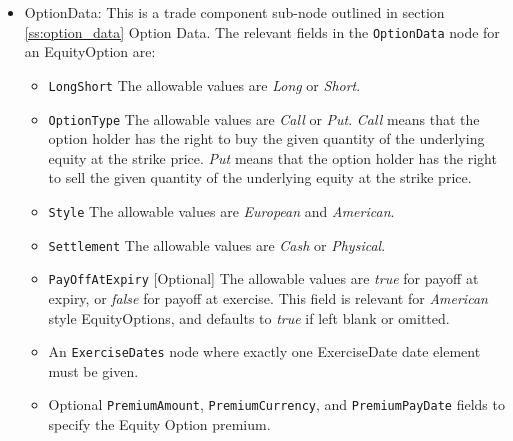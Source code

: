 \begin{itemize}
	\item OptionData: This is a trade component sub-node outlined in section \ref{ss:option_data} Option Data. The relevant fields in the \lstinline!OptionData! node for an EquityOption are:

	
	\begin{itemize}
	\item \lstinline!LongShort! The allowable values are \emph{Long} or \emph{Short}.

	\item \lstinline!OptionType! The allowable values are \emph{Call} or \emph{Put}.  \emph{Call} means that the option holder has the right to buy the given quantity of the underlying equity at the strike price.  \emph{Put} means that the option holder has the right to sell the given quantity of the underlying equity at the strike price. 
	
\item  \lstinline!Style! The allowable values are \emph{European} and \emph{American}. 

\item  \lstinline!Settlement! The allowable values are \emph{Cash} or \emph{Physical}.

\item \lstinline!PayOffAtExpiry! [Optional] The allowable values are \emph{true} for payoff at expiry, or \emph{false} for payoff at exercise. This field is relevant for \emph{American} style EquityOptions, and defaults to \emph{true} if left blank or omitted. 

\item An \lstinline!ExerciseDates! node where exactly one ExerciseDate date element must be given. 

\item Optional \lstinline!PremiumAmount!,  \lstinline!PremiumCurrency!, and \lstinline!PremiumPayDate! fields to specify the Equity Option premium. 

\end{itemize}
	


\end{itemize}
